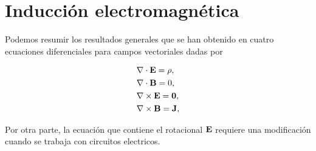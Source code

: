 \chapter{Inducción electromagnética}
Podemos resumir los resultados generales que se han obtenido en cuatro ecuaciones diferenciales para campos vectoriales dadas por

\begin{align}
	\label{Eq:EqElectrostatica}
	 & \nabla \cdot \textbf{E} = \rho,       \\
	 & \nabla \cdot \textbf{B} = 0,          \\
	 & \nabla \times \textbf{E} = \textbf{0}, \\
	 & \nabla \times \textbf{B} = \textbf{J},
\end{align}

Por otra parte, la ecuación que contiene el rotacional $\textbf{E}$ requiere una modificación cuando se trabaja con circuitos electricos.


